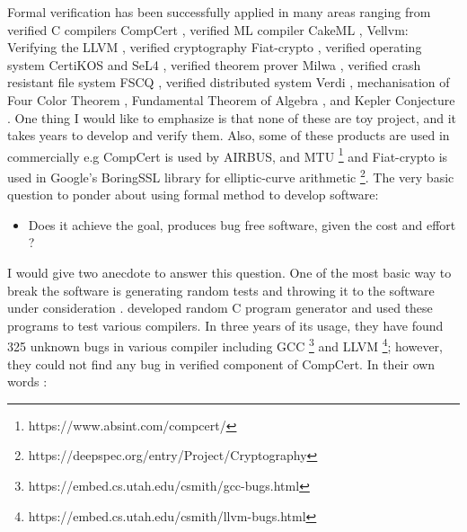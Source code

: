 	Formal verification has been successfully applied in many areas ranging 
	from verified C compilers CompCert \citep{DBLP:conf/popl/Leroy06}, verified ML compiler
	CakeML \citep{Kumar:2014:CVI}, Vellvm: Verifying the LLVM 
	\citep{10.1007/978-3-642-35308-6_6}, verified cryptography 
	Fiat-crypto \citep{DBLP:conf/sp/ErbsenPGSC19}, verified 
	operating system CertiKOS \citep{DBLP:conf/apsys/GuVFSC11} and 
	SeL4 \citep{DBLP:conf/sosp/KleinEHACDEEKNSTW09}, verified theorem 
	prover Milwa \citep{DBLP:conf/itp/MyreenD14}, 
	verified crash resistant file system FSCQ \citep{Chen:2015:UCH:2815400.2815402}, 
	verified distributed system 
	Verdi \citep{DBLP:conf/pldi/WilcoxWPTWEA15} , mechanisation of 
	Four Color Theorem \citep{10.1007/978-3-540-87827-8_28}, 
	Fundamental Theorem of 
	Algebra \citep{10.1007/3-540-45842-5_7}, and Kepler Conjecture \citep{hales-kepler}.
	One thing I would like to emphasize 
	is that none of these are toy project, and it takes years 
	to develop and verify them. Also, some of these products 
	are used in commercially e.g CompCert is used by AIRBUS, and MTU
	\footnote{https://www.absint.com/compcert/} and Fiat-crypto is used 
	in Google's BoringSSL library for elliptic-curve arithmetic 
	\footnote{https://deepspec.org/entry/Project/Cryptography}. 
	The very basic question to ponder about using formal method to develop 
	software: 
	\begin{itemize}
	\item Does it achieve the goal, produces bug free software,  given the cost and effort ?
\end{itemize}	 
	
	I would give two anecdote to answer this question. 
	One of the most basic way to 
	break the software is generating random tests and throwing it to 
	the software under consideration \citep{Miller:1990:ESR:96267.96279}.
	\citep{Yang:2011:FUB:1993316.1993532} developed random 
	C program generator and used these programs to test various 
	compilers. In three years of its usage, they have found 325 unknown
	bugs in various compiler including GCC
	\footnote{https://embed.cs.utah.edu/csmith/gcc-bugs.html} and LLVM
	\footnote{https://embed.cs.utah.edu/csmith/llvm-bugs.html}; however, 
	they could not find any bug in verified component of CompCert. 
	In their own words \citep{Yang:2011:FUB:1993316.1993532}:
	
